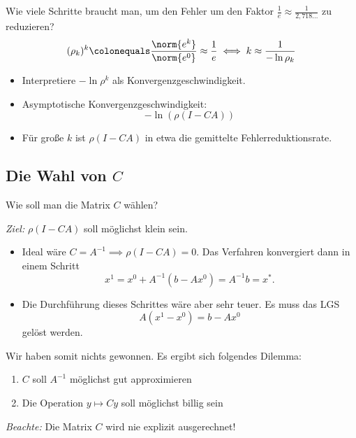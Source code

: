 \bigskip

Wie viele Schritte braucht man, um den Fehler um den Faktor $\frac{1}{e} \approx \frac{1}{2,718 \ldots}$ zu reduzieren?
\begin{equation*}
 (\rho_k)^k
  \colonequals
 \frac{\norm{e^k}}{\norm{e^0}}
  \approx
 \frac{1}{e} \iff k \approx \frac{1}{-\ln{\rho_k}}
\end{equation*}
\begin{itemize}
    \item Interpretiere $-\ln \rho^k$ als Konvergenzgeschwindigkeit.
    \item Asymptotische Konvergenzgeschwindigkeit: \begin{equation*}
    		-\ln (\rho (I-CA))
    	\end{equation*}
    \item Für große $k$ ist $\rho (I-CA)$ in etwa die gemittelte Fehlerreduktionsrate.
\end{itemize}

\subsection{Die Wahl von $C$}

Wie soll man die Matrix $C$ wählen?

\emph{Ziel:} $\rho (I-CA)$ soll möglichst klein sein.
\begin{itemize}
 \item Ideal wäre $C=A^{-1} \implies \rho (I-CA)=0$. Das Verfahren konvergiert dann in einem Schritt
  \begin{equation*}
   x^1=x^0+A^{-1} (b-Ax^0) = A^{-1}b = x^*.
  \end{equation*}
 \item Die Durchführung dieses Schrittes wäre aber sehr teuer. Es muss das LGS
\begin{equation*}
 A(x^1-x^0) = b-Ax^0
\end{equation*}
gelöst werden.
\end{itemize}

Wir haben somit nichts gewonnen. Es ergibt sich folgendes Dilemma:
\begin{enumerate}
    \item $C$ soll $A^{-1}$ möglichst gut approximieren
    \item Die Operation $y \mapsto Cy$ soll möglichst billig sein
\end{enumerate}
\emph{Beachte:} Die Matrix $C$ wird nie explizit ausgerechnet!



